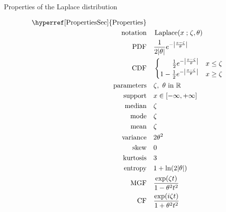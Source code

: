 

\begin{table*}[t!]
\caption[Laplace distribution -- Properties]{Properties of the Laplace distribution}
\begin{align*}
\text{\hyperref[PropertiesSec]{Properties}}  \quad& \\
\text{notation}\quad & \op{Laplace}(x\given \pLoc, \theta) 				\checked
\\ 
\text{PDF} \quad & \frac{1}{2 |\theta|} e^{- \Left|\frac{x-\pLoc}{\theta}\Right|} 	\checked
\\
\text{CDF} \quad & 
\begin{cases}
\phantom{\tfrac{1}{2} -\ } \frac{1}{2} e^{ - \Left|\frac{x-\pLoc}{\theta}\Right| } & x\leq \pLoc  \checked
\\
1 - \tfrac{1}{2} e^{ - \Left|\frac{x-\pLoc}{\theta}\Right| } & x\geq \pLoc 			\checked
\end{cases}
\\
\text{parameters}\quad & \pLoc,\ \theta \text{ in } \mathbb{R}				\checked
\\
\text{support} \quad & x \in [ -\infty, +\infty] 							\checked
\\
\text{median} \quad & \pLoc                            							\checked
\\
\text{mode} \quad & \pLoc 										\checked
\\
\text{mean} \quad & \pLoc  										\checked
\\
\text{variance} \quad & 2\theta^2 									\checked
\\
\text{skew} \quad & 0 											\checked
\\ 
\text{kurtosis} \quad & 3 											\checked
\\ 
\text{entropy} \quad & 1+ \ln( 2 |\theta|) 								\checked
\\ 
\text{MGF} \quad &  \frac{\exp(\pLoc t) }{1- \theta^2 t^2}					\checked
\\
\text{CF} \quad & \frac{\exp(i\pLoc t) }{1+ \theta^2 t^2}					\checked
\end{align*}
\end{table*}